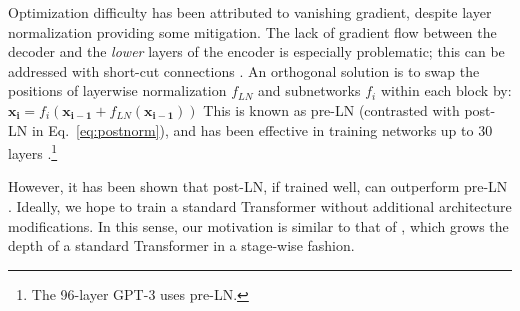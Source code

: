 Optimization difficulty has been attributed to vanishing gradient, despite layer normalization \cite{xu2019improveln} providing some mitigation. 
The lack of gradient flow between the decoder and the {\em lower} layers of the encoder is especially problematic; this can be addressed with short-cut connections \cite{bapna2018training,he2018layer-wise}.
An orthogonal solution is to swap the positions of layerwise normalization $f_{LN}$ and subnetworks $f_{i}$ within each block \cite{Nguyen2019fixnorm,domhan2018ananmt,chen2018-best-adv-nmt} by:  
\begin{math}
\label{eq:prenorm}
    \mathbf{x_{i}}=f_{i}(\mathbf{x_{i-1}} + f_{LN}(\mathbf{x_{i-1}}))
\end{math}
This is known as pre-LN (contrasted with post-LN in Eq.~\ref{eq:postnorm}), and has been effective in training networks up to 30 layers \cite{wang2019preln}.\footnote{The 96-layer GPT-3 \cite{brown2020gpt3} uses pre-LN.}

However, it has been shown that post-LN, if trained well, can outperform pre-LN \cite{liu2020deeptransformer}. 
Ideally, we hope to train a standard Transformer without additional architecture modifications. 
In this sense, our motivation is similar to that of \citet{wu2019depth}, which grows the depth of a standard Transformer in a stage-wise fashion.
